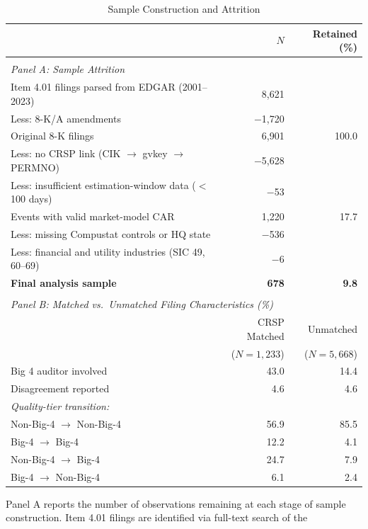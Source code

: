 \begin{table}[htbp]
\centering
\caption{Sample Construction and Attrition}
\label{tab:attrition}
\small
\begin{tabular}{lrr}
\hline\hline
 & $N$ & Retained (\%) \\
\hline
\\[-6pt]
\multicolumn{3}{l}{\textit{Panel A: Sample Attrition}} \\[3pt]
Item 4.01 filings parsed from EDGAR (2001--2023) & 8,621 &  \\
\quad Less: 8-K/A amendments & $-$1,720 &  \\
Original 8-K filings & 6,901 & 100.0 \\
\quad Less: no CRSP link (CIK $\to$ gvkey $\to$ PERMNO) & $-$5,628 &  \\
\quad Less: insufficient estimation-window data ($<$100 days) & $-$53 &  \\
Events with valid market-model CAR & 1,220 & 17.7 \\
\quad Less: missing Compustat controls or HQ state & $-$536 &  \\
\quad Less: financial and utility industries (SIC 49, 60--69) & $-$6 &  \\
\textbf{Final analysis sample} & \textbf{678} & \textbf{9.8} \\[6pt]
\hline
\\[-6pt]
\multicolumn{3}{l}{\textit{Panel B: Matched vs.\ Unmatched Filing Characteristics (\%)}} \\[3pt]
 & CRSP Matched & Unmatched \\
 & ($N = 1{,}233$) & ($N = 5{,}668$) \\[3pt]
Big 4 auditor involved & 43.0 & 14.4 \\
Disagreement reported & 4.6 & 4.6 \\[3pt]
\textit{Quality-tier transition:} & & \\
\quad Non-Big-4 $\to$ Non-Big-4 & 56.9 & 85.5 \\
\quad Big-4 $\to$ Big-4 & 12.2 & 4.1 \\
\quad Non-Big-4 $\to$ Big-4 & 24.7 & 7.9 \\
\quad Big-4 $\to$ Non-Big-4 & 6.1 & 2.4 \\
\hline\hline
\end{tabular}
\begin{minipage}{0.92\textwidth}
\vspace{4pt}
\footnotesize
Panel A reports the number of observations remaining at each stage of sample
construction. Item 4.01 filings are identified via full-text search of the

\end{minipage}
\end{table}
